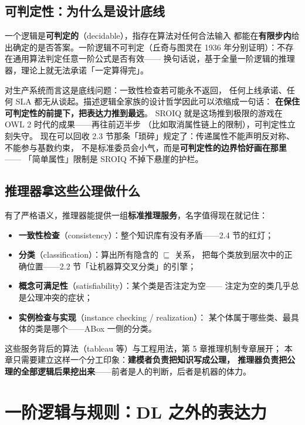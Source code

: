 \subsection{可判定性：为什么是设计底线}

一个逻辑是\textbf{可判定的}（decidable），指存在算法对任何合法输入
都能在\textbf{有限步内}给出确定的是否答案。一阶逻辑不可判定（丘奇与图灵在
1936 年分别证明）：不存在通用算法判定任意一阶公式是否有效——
换句话说，基于全量一阶逻辑的推理器，理论上就无法承诺「一定算得完」。

对生产系统而言这是底线问题：一致性检查若可能永不返回，
任何上线承诺、任何 SLA 都无从谈起。描述逻辑全家族的设计哲学因此可以浓缩成一句话：
\textbf{在保住可判定性的前提下，把表达力推到最远}。
SROIQ 就是这场推到极限的游戏在 OWL 2 时代的成果——再往前迈半步
（比如取消属性链上的限制），可判定性立刻失守。
现在可以回收 2.3 节那条「琐碎」规定了：传递属性不能声明反对称、不能参与基数约束，
不是标准委员会小气，而是\textbf{可判定性的边界恰好画在那里}——
「简单属性」限制是 SROIQ 不掉下悬崖的护栏。

\subsection{推理器拿这些公理做什么}

有了严格语义，推理器能提供一组\textbf{标准推理服务}，名字值得现在就记住：

\begin{itemize}
\item \textbf{一致性检查}（consistency）：整个知识库有没有矛盾——2.4 节的红灯；
\item \textbf{分类}（classification）：算出所有隐含的 \(\sqsubseteq\) 关系，
      把每个类放到层次中的正确位置——2.2 节「让机器算交叉分类」的引擎；
\item \textbf{概念可满足性}（satisfiability）：某个类是否注定为空——
      注定为空的类几乎总是公理冲突的症状；
\item \textbf{实例检查与实现}（instance checking / realization）：
      某个体属于哪些类、最具体的类是哪个——ABox 一侧的分类。
\end{itemize}

这些服务背后的算法（tableau 等）与工程用法，第 5 章推理机制专章展开；
本章只需要建立这样一个分工印象：\textbf{建模者负责把知识写成公理，
推理器负责把公理的全部逻辑后果挖出来}——前者是人的判断，后者是机器的体力。

\section{一阶逻辑与规则：DL 之外的表达力}

